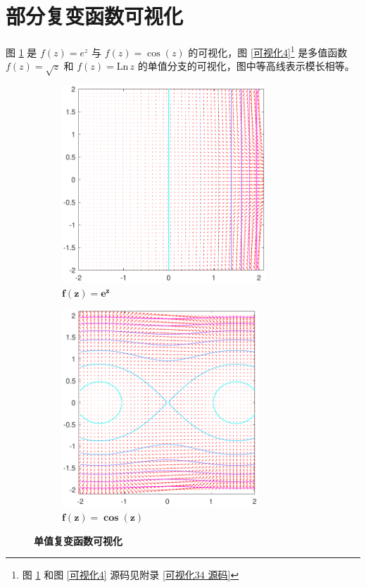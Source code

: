 \documentclass[UTF8]{report}
\def\Ln{\mathrm{Ln\,}}
\theoremstyle{MyLineTheoremStyle} %
\theoremstyle{MyBlockTheoremStyle} %
\theoremstyle{MySubsubsectionStyle} %
\begin{document}
\section{部分复变函数可视化}

图 \ref{可视化3} 是 $f(z) = e^z$ 与 $f(z) = \cos (z)$ 的可视化，图 \ref{可视化4}\footnote{图 \ref{可视化3} 和图 \ref{可视化4} 源码见附录 \ref{可视化34 源码}} 是多值函数 $f(z) = \sqrt{z}$ 和 $f(z) = \Ln z$ 的单值分支的可视化，图中等高线表示模长相等。

\begin{figure}[H]\centering
\begin{subfigure}[t]{0.49\textwidth}\centering
    \includegraphics[height=210pt]{assets/1,2/e^z.pdf}
    \caption{\bfseries $\boldsymbol{f(z) = e^z}$ }
\end{subfigure}\begin{subfigure}[t]{0.49\textwidth}\centering
    \includegraphics[height=210pt]{assets/1,2/cos z.pdf}
    \caption{\bfseries $\boldsymbol{f(z) = \cos (z)}$ }
\end{subfigure}
\caption{\bfseries 单值复变函数可视化 }\label{可视化3}
\end{figure}
\end{document}

